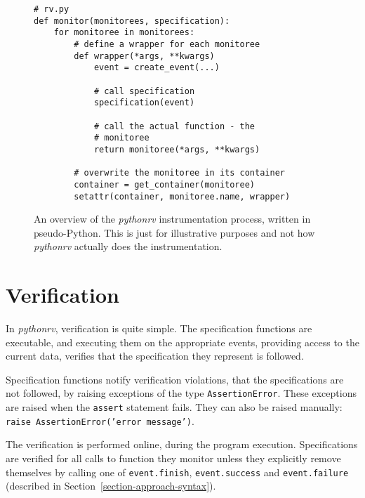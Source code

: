 \documentclass[a4paper,11pt]{kth-mag}
\begin{document}
\begin{figure}[h!]
	\begin{center}
	\begin{minipage}{0.7\textwidth}
	\begin{lstlisting}
# rv.py
def monitor(monitorees, specification):
	for monitoree in monitorees:
		# define a wrapper for each monitoree
		def wrapper(*args, **kwargs)
			event = create_event(...)

			# call specification
			specification(event)

			# call the actual function - the
			# monitoree
			return monitoree(*args, **kwargs)

		# overwrite the monitoree in its container
		container = get_container(monitoree)
		setattr(container, monitoree.name, wrapper)
	\end{lstlisting}
	\end{minipage}
	\end{center}

	\caption{An overview of the \textit{pythonrv} instrumentation process,
		written in pseudo-Python. This is just for illustrative purposes and not
		how \textit{pythonrv} actually does the instrumentation.}
	\label{figure-instrumentation-overview}
\end{figure}



\section{Verification} \label{section-approach-verification}

In \textit{pythonrv}, verification is quite simple. The specification functions
are executable, and executing them on the appropriate events, providing access
to the current data, verifies that the specification they represent is
followed.

Specification functions notify verification violations, that the specifications
are not followed, by raising exceptions of the type \texttt{AssertionError}.
These exceptions are raised when the \texttt{assert} statement fails. They can
also be raised manually: \texttt{raise AssertionError('error message')}.

The verification is performed online, during the program execution.
Specifications are verified for all calls to function they monitor unless they
explicitly remove themselves by calling one of \texttt{event.finish},
\texttt{event.success} and \texttt{event.failure} (described in
Section~\ref{section-approach-syntax}).
\end{document}

